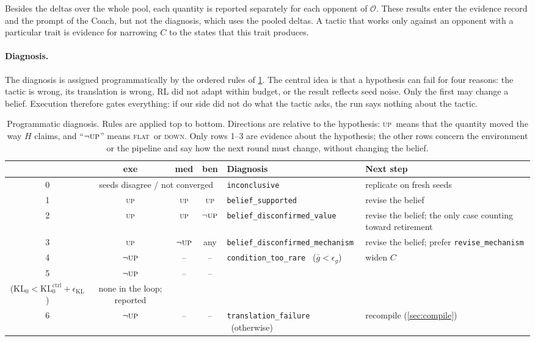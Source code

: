\documentclass[11pt]{article}
\newcommand{\opp}{\mathcal{O}}           %
\newcommand{\gbar}{\bar{g}}
\newcommand{\code}[1]{\texttt{\small #1}}
\newcommand{\pUp}{\textsc{up}}
\newcommand{\pFlat}{\textsc{flat}}
\newcommand{\pDown}{\textsc{down}}
\begin{document}
Besides the deltas over the whole pool, each quantity is reported separately for each opponent of $\opp$.
These results enter the evidence record and the prompt of the Coach, but not the diagnosis, which uses the pooled deltas.
A tactic that works only against an opponent with a particular trait is evidence for narrowing $C$ to the states that this trait produces.

\paragraph{Diagnosis.}
The diagnosis is assigned programmatically by the ordered rules of \cref{tab:diagnosis}.
The central idea is that a hypothesis can fail for four reasons: the tactic is wrong, its translation is wrong, RL did not adapt within budget, or the result reflects seed noise.
Only the first may change a belief.
Execution therefore gates everything: if our side did not do what the tactic asks, the run says nothing about the tactic.

\begin{table}[t]
\centering\small
\caption{Programmatic diagnosis. Rules are applied top to bottom. Directions are relative to the hypothesis: \pUp\ means that the quantity moved the way $H$ claims, and ``$\neg\pUp$'' means \pFlat\ or \pDown. Only rows 1--3 are evidence about the hypothesis; the other rows concern the environment or the pipeline and say how the next round must change, without changing the belief.}
\label{tab:diagnosis}
\begin{tabularx}{\linewidth}{@{}c c c c l X@{}}
\toprule
& exe & med & ben & Diagnosis & Next step \\
\midrule
0 & \multicolumn{3}{c}{seeds disagree / not converged} & \code{inconclusive} & replicate on fresh seeds \\
\midrule
1 & \pUp & \pUp & \pUp & \code{belief\_supported} & revise the belief \\
2 & \pUp & \pUp & $\neg\pUp$ & \code{belief\_disconfirmed\_value} & revise the belief; the only case counting toward retirement \\
3 & \pUp & $\neg\pUp$ & any & \code{belief\_disconfirmed\_mechanism} & revise the belief; prefer \code{revise\_mechanism} \\
\midrule
4 & $\neg\pUp$ & -- & -- & \code{condition\_too\_rare} \ ($\gbar < \epsilon_g$) & widen $C$ \\
5 & $\neg\pUp$ & -- & -- & \begin{tabular}[t]{@{}l@{}}\code{insufficient\_adaptation}\\ ($\mathrm{KL}_0 < \mathrm{KL}_0^{\mathrm{ctrl}} + \epsilon_{\mathrm{KL}}$)\end{tabular} & none in the loop; reported \\
6 & $\neg\pUp$ & -- & -- & \code{translation\_failure} \ (otherwise) & recompile (\cref{sec:compile}) \\
\bottomrule
\end{tabularx}
\end{table}
\end{document}
